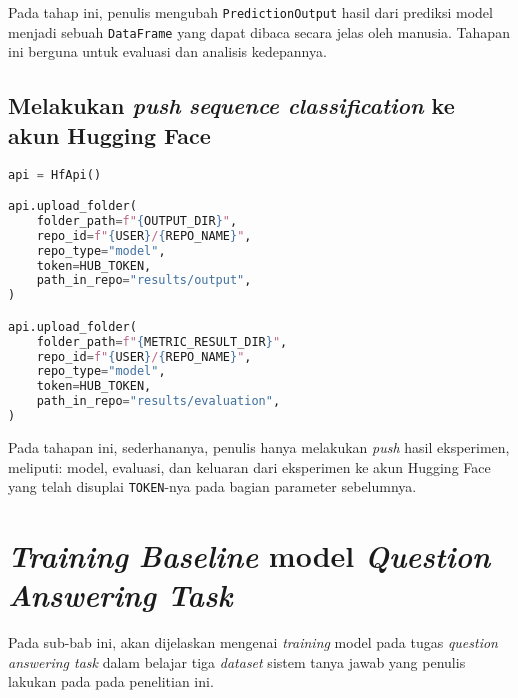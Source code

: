 Pada tahap ini, penulis mengubah \texttt{PredictionOutput} hasil dari prediksi model menjadi sebuah \texttt{DataFrame} yang dapat dibaca secara jelas oleh manusia. Tahapan ini berguna untuk evaluasi dan analisis kedepannya.

\subsection{Melakukan \emph{push} \emph{sequence classification} ke akun Hugging Face}
\begin{lstlisting}[language=Python, caption=Melakukan \emph{push} \emph{sequence classification} ke akun Hugging Face]
api = HfApi()

api.upload_folder(
    folder_path=f"{OUTPUT_DIR}",
    repo_id=f"{USER}/{REPO_NAME}",
    repo_type="model",
    token=HUB_TOKEN,
    path_in_repo="results/output",
)

api.upload_folder(
    folder_path=f"{METRIC_RESULT_DIR}",
    repo_id=f"{USER}/{REPO_NAME}",
    repo_type="model",
    token=HUB_TOKEN,
    path_in_repo="results/evaluation",
)
\end{lstlisting}

Pada tahapan ini, sederhananya, penulis hanya melakukan \emph{push} hasil eksperimen, meliputi: model, evaluasi, dan keluaran dari eksperimen ke akun Hugging Face yang telah disuplai \texttt{TOKEN}-nya pada bagian parameter sebelumnya.

\section{\emph{Training} \emph{Baseline} model \emph{Question Answering Task}}
Pada sub-bab ini, akan dijelaskan mengenai \emph{training} model pada tugas \emph{question answering task} dalam belajar tiga \emph{dataset} sistem tanya jawab yang penulis lakukan pada pada penelitian ini.

